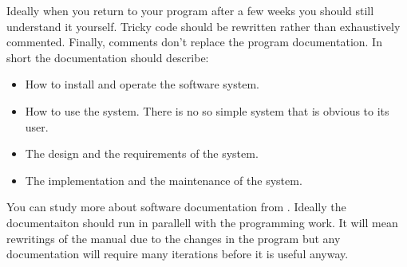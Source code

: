 Ideally when you  return to your program after a  few weeks you should
still understand it yourself.   Tricky code should be rewritten rather
than  exhaustively commented.   Finally, comments  don't  replace the
program  documentation. In short the documentation should describe:

\begin{itemize}
  \item How to install and operate the software system.
  \item How to use the system. There is no so simple system that is
  obvious to its user.
  \item The design and the requirements of the system.
  \item The implementation and the maintenance of the system.
\end{itemize} 

You    can   study    more   about    software    documentation   from
\cite{Som85}. Ideally  the documentaiton should run  in parallell with
the programming  work.  It will mean  rewritings of the  manual due to
the changes  in the  program but any  documentation will  require many
iterations before it is useful anyway.








